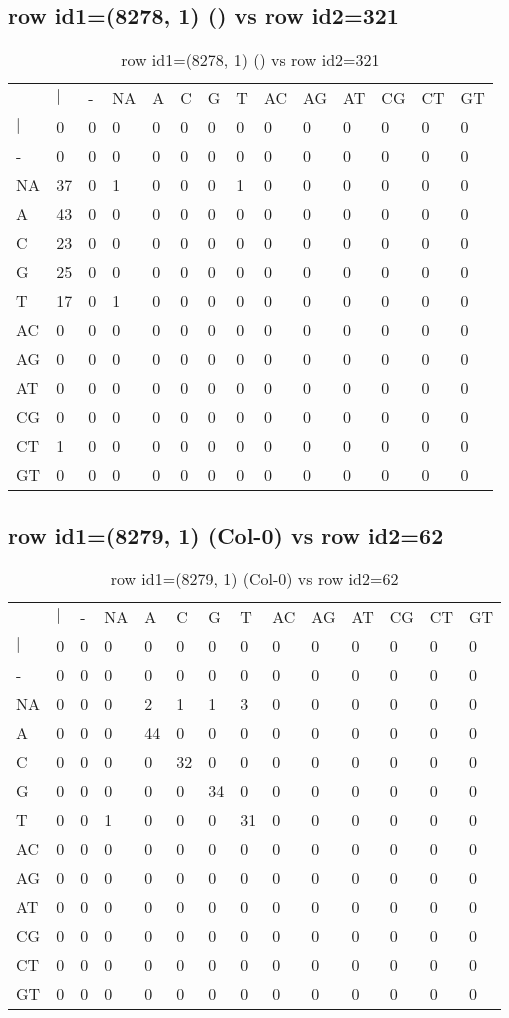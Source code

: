 \subsection{row id1=(8278, 1) () vs row id2=321}
\begin{center}
\begin{longtable}{|l|l|l|l|l|l|l|l|l|l|l|l|l|l|}
\caption{row id1=(8278, 1) () vs row id2=321} \label{table_dm434}\\
\hline
\\
\hline
&$|$&-&NA&A&C&G&T&AC&AG&AT&CG&CT&GT\\
$|$&0&0&0&0&0&0&0&0&0&0&0&0&0\\
-&0&0&0&0&0&0&0&0&0&0&0&0&0\\
NA&37&0&1&0&0&0&1&0&0&0&0&0&0\\
A&43&0&0&0&0&0&0&0&0&0&0&0&0\\
C&23&0&0&0&0&0&0&0&0&0&0&0&0\\
G&25&0&0&0&0&0&0&0&0&0&0&0&0\\
T&17&0&1&0&0&0&0&0&0&0&0&0&0\\
AC&0&0&0&0&0&0&0&0&0&0&0&0&0\\
AG&0&0&0&0&0&0&0&0&0&0&0&0&0\\
AT&0&0&0&0&0&0&0&0&0&0&0&0&0\\
CG&0&0&0&0&0&0&0&0&0&0&0&0&0\\
CT&1&0&0&0&0&0&0&0&0&0&0&0&0\\
GT&0&0&0&0&0&0&0&0&0&0&0&0&0\\
\hline
\end{longtable}
\end{center}

\subsection{row id1=(8279, 1) (Col-0) vs row id2=62}
\begin{center}
\begin{longtable}{|l|l|l|l|l|l|l|l|l|l|l|l|l|l|}
\caption{row id1=(8279, 1) (Col-0) vs row id2=62} \label{table_dm436}\\
\hline
\\
\hline
&$|$&-&NA&A&C&G&T&AC&AG&AT&CG&CT&GT\\
$|$&0&0&0&0&0&0&0&0&0&0&0&0&0\\
-&0&0&0&0&0&0&0&0&0&0&0&0&0\\
NA&0&0&0&2&1&1&3&0&0&0&0&0&0\\
A&0&0&0&44&0&0&0&0&0&0&0&0&0\\
C&0&0&0&0&32&0&0&0&0&0&0&0&0\\
G&0&0&0&0&0&34&0&0&0&0&0&0&0\\
T&0&0&1&0&0&0&31&0&0&0&0&0&0\\
AC&0&0&0&0&0&0&0&0&0&0&0&0&0\\
AG&0&0&0&0&0&0&0&0&0&0&0&0&0\\
AT&0&0&0&0&0&0&0&0&0&0&0&0&0\\
CG&0&0&0&0&0&0&0&0&0&0&0&0&0\\
CT&0&0&0&0&0&0&0&0&0&0&0&0&0\\
GT&0&0&0&0&0&0&0&0&0&0&0&0&0\\
\hline
\end{longtable}
\end{center}


